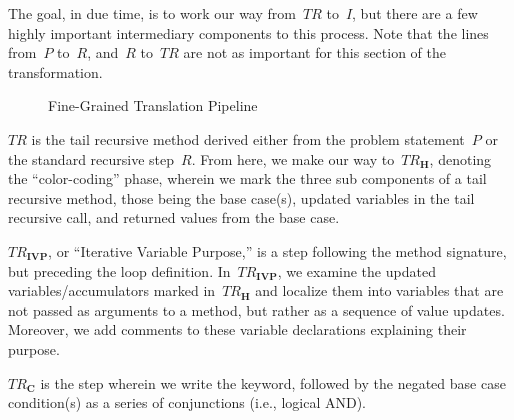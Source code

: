 The goal, in due time, is to work our way from~\emph{$TR$} to~$I$, but there are a few highly important intermediary components to this process. 
Note that the lines from~$P$ to~$R$, and~$R$ to~$TR$ are not as important for this section of the transformation.

\begin{figure}[h!]
\centering
{}
\caption{Fine-Grained Translation Pipeline}
\end{figure}

$TR$ is the tail recursive method derived either from the problem statement~$P$ or the standard recursive step~$R$. 
From here, we make our way to~\emph{$TR_\mathbf{H}$}, denoting the ``color-coding'' phase, wherein we mark the three sub components of a tail recursive method, those being the base case(s), updated variables in the tail recursive call, and returned values from the base case. 

\emph{$TR_\mathbf{IVP}$}, or ``Iterative Variable Purpose,'' is a step following the method signature, but preceding the loop definition. 
In~\emph{$TR_\mathbf{IVP}$}, we examine the updated variables/accumulators marked in~\emph{$TR_\mathbf{H}$} and localize them into variables that are not passed as arguments to a method, but rather as a sequence of value updates. 
Moreover, we add comments to these variable declarations explaining their purpose.

\emph{$TR_\mathbf{C}$} is the step wherein we write the  keyword, followed by the negated base case condition(s) as a series of conjunctions (i.e., logical AND).

